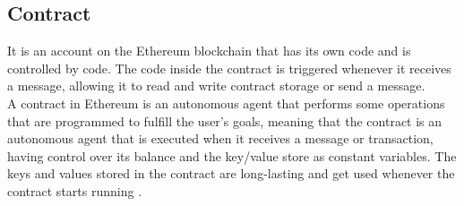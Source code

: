 \subsection{Contract} 
It is an account on the Ethereum blockchain that has its own code and is controlled by code. The code inside the contract is triggered whenever it receives a message, allowing it to read and write contract storage or send a message. \\
A contract in Ethereum is an autonomous agent that performs some operations that are programmed to fulfill the user's goals, meaning that the contract is an autonomous agent that is executed when it receives a message or transaction, having control over its balance and the key/value store as constant variables.
The keys and values stored in the contract are long-lasting and get used whenever the contract starts running \cite{Egbertsen}.

